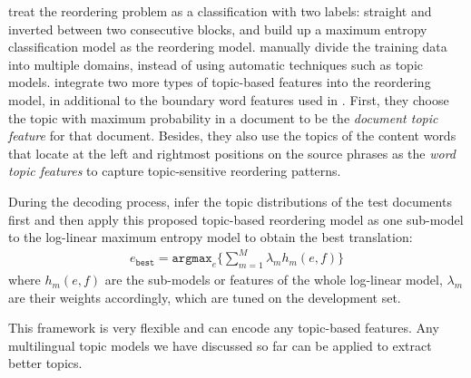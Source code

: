 \citet{Xiong-2006} treat the
reordering problem as a classification with two labels: straight and
inverted between two consecutive blocks, and build up a maximum
entropy classification model as the reordering model.
\citet{Chen-2013} manually divide the training data into
multiple domains, instead of using automatic techniques such as topic
models.
\citet{wang-14} integrate two more types of
topic-based features into the reordering model, in additional to the
boundary word features used in \citet{Xiong-2006}. First, they choose
the topic with maximum probability in a document to be the
\textit{document topic feature} for that document. Besides, they also
use the topics of the content words that locate at the left and
rightmost positions on the source phrases as the \textit{word topic
  features} to capture topic-sensitive reordering patterns.

During the decoding process, \citet{Xiong-2006} infer the topic
distributions of the test documents first and then apply this proposed
topic-based reordering model as one sub-model to the log-linear maximum entropy model
to obtain the best translation:
\begin{align}
e_\texttt{best} = \texttt{argmax}_e \Big \{ \sum_{m=1}^M \lambda_m h_m(e,f) \Big \}
\end{align}
where $h_m(e,f)$ are the sub-models or features of the whole
log-linear model, $\lambda_m$ are their weights accordingly, which are
tuned on the development set.

This framework is very flexible and can encode any topic-based features.
Any multilingual topic models we have discussed so far can be
applied to extract better topics.



